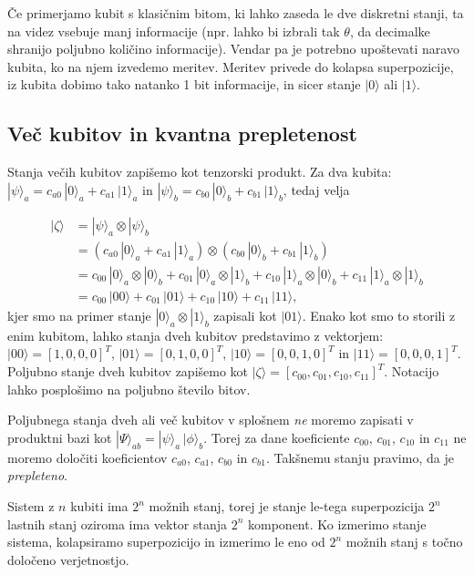 \documentclass[12pt]{article}
\begin{document}
Če primerjamo kubit s klasičnim bitom, ki lahko zaseda le dve diskretni stanji, ta na videz vsebuje manj informacije (npr. lahko bi izbrali tak $\theta$, da decimalke shranijo poljubno količino informacije). Vendar pa je potrebno upoštevati naravo kubita, ko na njem izvedemo meritev. Meritev privede do kolapsa superpozicije, iz kubita dobimo tako natanko 1 bit informacije, in sicer stanje $| 0 \rangle$ ali $| 1 \rangle$. \cite{nielsenQuantumComputationQuantum2012}

\subsection{Več kubitov in kvantna prepletenost}

Stanja večih kubitov zapišemo kot tenzorski produkt. Za dva kubita: $| \psi \rangle_a = c_{a0} \, | 0 \rangle_a + c_{a1} \, | 1 \rangle_a$ in $| \psi \rangle_b = c_{b0} \, | 0 \rangle_b + c_{b1} \, | 1 \rangle_b$, tedaj velja
 
\begin{equation} \label{eq1}
\begin{split}
| \zeta \rangle & = | \psi \rangle_a \otimes | \psi \rangle_b\\
 & = (c_{a0} \, | 0 \rangle_a + c_{a1} \, | 1 \rangle_a) \otimes (c_{b0} \, | 0 \rangle_b + c_{b1} \, | 1 \rangle_b) \\
 & = c_{00} \, | 0 \rangle_a \otimes | 0 \rangle_b + 
c_{01} \, | 0 \rangle_a \otimes | 1 \rangle_b + c_{10} \, | 1 \rangle_a \otimes | 0 \rangle_b + c_{11} \, | 1 \rangle_a \otimes | 1 \rangle_b \\ 
 & =  c_{00} \, | 00 \rangle + c_{01} \, | 01 \rangle + c_{10} \, | 10 \rangle + c_{11} \, | 11 \rangle,
\end{split}
\end{equation}
kjer smo na primer stanje $ | 0 \rangle_a \otimes | 1 \rangle_b $ zapisali kot $ | 01 \rangle $. Enako kot smo to storili z enim kubitom, lahko stanja dveh kubitov predstavimo z vektorjem: $ | 00 \rangle = [1,0,0,0]^T $, $ | 01 \rangle = [0,1,0,0]^T $, $ | 10 \rangle = [0,0,1,0]^T $ in $ | 11 \rangle = [0,0,0,1]^T $. Poljubno stanje dveh kubitov zapišemo kot $ | \zeta \rangle = [c_{00}, c_{01}, c_{10}, c_{11}]^T $. Notacijo lahko posplošimo na poljubno število bitov. \cite{pompeKvantniAlgoritmi2022}

\par

Poljubnega stanja dveh ali več kubitov v splošnem \emph{ne} moremo zapisati v produktni bazi kot $ | \Psi \rangle_{ab} = | \psi \rangle_a \, |\phi \rangle_b$. Torej za dane koeficiente $c_{00}$, $c_{01}$, $c_{10}$ in $c_{11}$ ne moremo določiti koeficientov $c_{a0}$, $c_{a1}$, $c_{b0}$ in $c_{b1}$. Takšnemu stanju pravimo, da je \emph{prepleteno}. \cite{pompeKvantniAlgoritmi2022}
\par Sistem z $n$ kubiti ima $2^n$ možnih stanj, torej je stanje le-tega superpozicija $2^n$ lastnih stanj oziroma ima vektor stanja $2^n$ komponent. Ko izmerimo stanje sistema, kolapsiramo superpozicijo in izmerimo le eno od $2^n$ možnih stanj s točno določeno verjetnostjo. \cite{pompeKvantniAlgoritmi2022}
\end{document}

